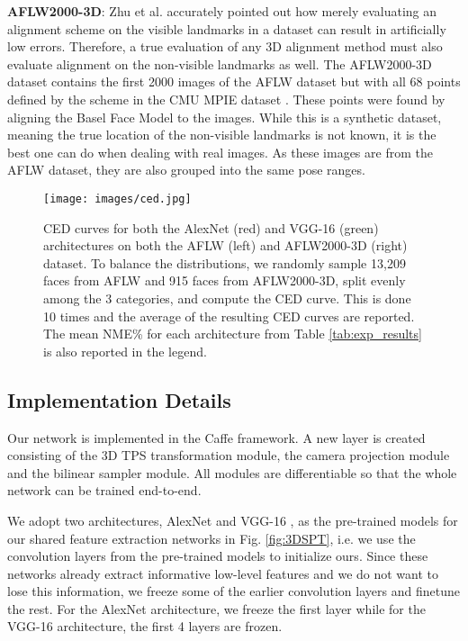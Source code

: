 \documentclass[10pt,twocolumn,letterpaper]{article}
\begin{document}
\textbf{AFLW2000-3D}: Zhu et al. \cite{Zhu16falp} accurately pointed out how merely evaluating an alignment scheme on the visible landmarks in a dataset can result in artificially low errors. Therefore, a true evaluation of any 3D alignment method must also evaluate alignment on the non-visible landmarks as well. The AFLW2000-3D dataset contains the first 2000 images of the AFLW dataset but with all 68 points defined by the scheme in the CMU MPIE dataset \cite{mpie1,mpie2}. These points were found by aligning the Basel Face Model to the images. While this is a synthetic dataset, meaning the true location of the non-visible landmarks is not known, it is the best one can do when dealing with real images. As these images are from the AFLW dataset, they are also grouped into the same pose ranges.

\begin{figure*}[t!]
\centering
\texttt{[image: images/ced.jpg]}
\caption{CED curves for both the AlexNet (red) and VGG-16 (green) architectures on both the AFLW (left) and AFLW2000-3D (right) dataset. To balance the distributions, we randomly sample 13,209 faces from AFLW and 915 faces from AFLW2000-3D, split evenly among the 3 categories, and compute the CED curve. This is done 10 times and the average of the resulting CED curves are reported. The mean NME\% for each architecture from Table \ref{tab:exp_results} is also reported in the legend.}
\label{fig:ced}
\end{figure*}

\subsection{Implementation Details}
Our network is implemented in the Caffe \cite{jia2014caffe} framework. A new layer is created consisting of the 3D TPS transformation module, the camera projection module and the bilinear sampler module. All modules are differentiable so that the whole network can be trained end-to-end.

We adopt two architectures, AlexNet \cite{krizhevsky2012imagenet} and VGG-16 \cite{simonyan2014very}, as the pre-trained models for our shared feature extraction networks in Fig. \ref{fig:3DSPT}, i.e. we use the convolution layers from the pre-trained models to initialize ours. Since these networks already extract informative low-level features and we do not want to lose this information, we freeze some of the earlier convolution layers and finetune the rest. For the AlexNet architecture, we freeze the first layer while for the VGG-16 architecture, the first 4 layers are frozen.
\end{document}
